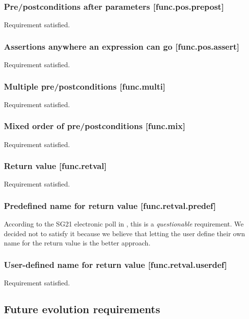 \subsubsection{Pre/postconditions after parameters [func.pos.prepost]}

Requirement satisfied.

\subsubsection{Assertions anywhere an expression can go [func.pos.assert]}

Requirement satisfied.

\subsubsection{Multiple pre/postconditions  [func.multi]}

Requirement satisfied.

\subsubsection{Mixed order of pre/postconditions  [func.mix]}

Requirement satisfied.

\subsubsection{Return value  [func.retval]}

Requirement satisfied.

\subsubsection{Predefined name for return value  [func.retval.predef]}

According to the SG21 electronic poll in \cite{P2885R3}, this is a \emph{questionable} requirement. We decided not to satisfy it because we believe that letting the user define their own name for the return value is the better approach.

\subsubsection{User-defined name for return value  [func.retval.userdef]}

Requirement satisfied.

\subsection{Future evolution requirements}

